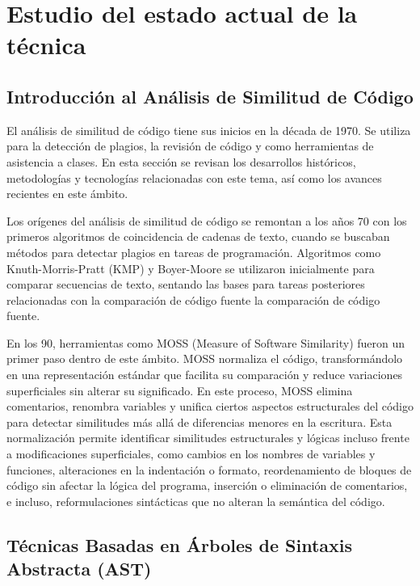 \chapter{Estudio del estado actual de la técnica}\label{chapter:state-of-the-art}

\section{Introducción al Análisis de Similitud de Código}
El análisis de similitud de código tiene sus inicios en la década de 1970\cite{knuth1977patternmatching}. Se utiliza para la detección de plagios, la revisión de código y como herramientas de asistencia a clases. En esta sección se revisan los desarrollos históricos, metodologías y tecnologías relacionadas con este tema, así como los avances recientes en este ámbito.

Los orígenes del análisis de similitud de código se remontan a los años 70 con los primeros algoritmos de coincidencia de cadenas de texto, cuando se buscaban métodos para detectar plagios en tareas de programación. Algoritmos como Knuth-Morris-Pratt (KMP) \cite{knuth1977patternmatching} y Boyer-Moore \cite{boyer1977stringsearch} se utilizaron inicialmente para comparar secuencias de texto, sentando las bases para tareas posteriores relacionadas con la comparación de código fuente la comparación de código fuente.

En los 90, herramientas como MOSS (Measure of Software Similarity) \cite{aiken1994moss} fueron un primer paso dentro de este ámbito. MOSS normaliza el código, transform\'andolo en una representación estándar que facilita su comparación y reduce variaciones superficiales sin alterar su significado. En este proceso, MOSS elimina comentarios, renombra variables y unifica ciertos aspectos estructurales del código para detectar similitudes más allá de diferencias menores en la escritura. Esta normalización permite identificar similitudes estructurales y lógicas incluso frente a modificaciones superficiales, como cambios en los nombres de variables y funciones, alteraciones en la indentación o formato, reordenamiento de bloques de código sin afectar la lógica del programa, inserción o eliminación de comentarios, e incluso, reformulaciones sintácticas que no alteran la semántica del código. 

\section{Técnicas Basadas en Árboles de Sintaxis Abstracta (AST)}

